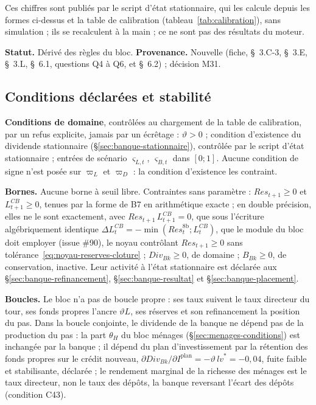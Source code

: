\documentclass[11pt,a4paper]{article}
\begin{document}
\begin{proposee}
Ces chiffres sont publiés par le script d'état stationnaire, qui les calcule depuis les formes ci-dessus et la table de calibration (tableau~\ref{tab:calibration}), sans simulation ; ils se recalculent à la main ; ce ne sont pas des résultats du moteur.

\textbf{Statut.} Dérivé des règles du bloc. \textbf{Provenance.} Nouvelle (fiche, \S~3.C-3, \S~3.E, \S~3.L, \S~6.1, questions Q4 à Q6, et \S~6.2) ; décision M31.
\end{proposee}

\subsection{Conditions déclarées et stabilité}
\label{sec:banque-conditions}
\begin{proposee}
\textbf{Conditions de domaine}, contrôlées au chargement de la table de calibration, par un refus explicite, jamais par un écrêtage : $\vartheta > 0$ ; condition d'existence du dividende stationnaire (\S\ref{sec:banque-stationnaire}), contrôlée par le script d'état stationnaire ; entrées de scénario $\varsigma_{L,t}$, $\varsigma_{B,t}$ dans $[0 ; 1]$. Aucune condition de signe n'est posée sur $\varpi_L$ et $\varpi_D$ : la condition d'existence les contraint.

\textbf{Bornes.} Aucune borne à seuil libre. Contraintes sans paramètre : $\mathit{Res}_{t+1} \ge 0$ et $L^{\mathit{CB}}_{t+1} \ge 0$, tenues par la forme de B7 en arithmétique exacte ; en double précision, elles ne le sont exactement, avec $\mathit{Res}_{t+1}\,L^{\mathit{CB}}_{t+1} = 0$, que sous l'écriture algébriquement identique $\Delta L^{\mathit{CB}}_t = -\min(\mathit{Res}^{8\mathrm{b}}_t ; L^{\mathit{CB}}_t)$, que le module du bloc doit employer (issue \#90), le noyau contrôlant $\mathit{Res}_{t+1} \ge 0$ sans tolérance~\eqref{eq:noyau-reserves-cloture} ; $\mathit{Div}_{\mathit{Bk}} \ge 0$, de domaine ; $B_{\mathit{Bk}} \ge 0$, de conservation, inactive. Leur activité à l'état stationnaire est déclarée aux \S\ref{sec:banque-refinancement}, \S\ref{sec:banque-resultat} et \S\ref{sec:banque-placement}.

\textbf{Boucles.} Le bloc n'a pas de boucle propre : ses taux suivent le taux directeur du tour, ses fonds propres l'ancre $\vartheta L$, ses réserves et son refinancement la position du pas. Dans la boucle conjointe, le dividende de la banque ne dépend pas de la production du pas : la part $\theta_H$ du bloc ménages (\S\ref{sec:menages-conditions}) est inchangée par la banque ; il dépend du plan d'investissement par la rétention des fonds propres sur le crédit nouveau, $\partial\mathit{Div}_{\mathit{Bk}}/\partial I^{\mathrm{plan}} = -\vartheta\,\mathit{lv}^\ast = -0{,}04$, fuite faible et stabilisante, déclarée ; le rendement marginal de la richesse des ménages est le taux directeur, non le taux des dépôts, la banque reversant l'écart des dépôts (condition C43).


\end{proposee}
\end{document}
